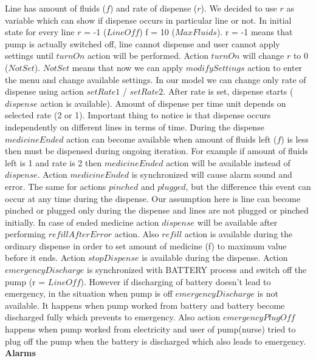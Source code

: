 \documentclass{article}
\begin{document}
Line has amount of fluids ($f$) and rate of dispense ($r$). We decided to use $r$ as variable which can show if dispense occurs in particular line or not. In initial state for every line $r$ = -1 ($LineOff$) f = 10 ($MaxFluids$). r = -1 means that pump is actually switched off, line cannot dispense and user cannot apply settings until $turnOn$ action will be performed. Action $turnOn$ will change $r$ to 0 ($NotSet$). $NotSet$ means that now we can apply $modifySettings$ action to enter the menu and change available settings. In our model we can change only rate of dispense using action $setRate1$ / $setRate2$. After rate is set, dispense starts ($dispense$ action is available). Amount of dispense per time unit depends on selected rate (2 or 1). Important thing to notice is that dispense occurs independently on different lines in terms of time. During the dispense $medicineEnded$ action can become available when amount of fluids left ($f$) is less then must be dispensed during ongoing iteration. For example if amount of fluids left is 1 and rate is 2 then $medicineEnded$ action will be available instead of $dispense$. Action $medicineEnded$ is synchronized will cause alarm sound and error. The same for actions $pinched$ and $plugged$, but the difference this event can occur at any time during the dispense. Our assumption here is line can become pinched or plugged only during the dispense and lines are not plugged or pinched initially. In case of ended medicine action $dispense$ will be available after performing $refillAfterError$ action. Also $refill$ action is available during the ordinary dispense in order to set amount of medicine (f) to maximum value before it ends. Action $stopDispense$ is available during the dispense. Action $emergencyDischarge$ is synchronized with BATTERY process and switch off the pump (r = $LineOff$). However if discharging of battery doesn’t lead to emergency, in the situation when pump is off $emergencyDischarge$ is not available. It happens when pump worked from battery and battery become discharged fully which prevents to emergency. Also action $emergencyPlugOff$ happens when pump worked from electricity and user of pump(nurse) tried to plug off the pump when the battery is discharged which also leads to emergency. \\

\textbf{Alarms} \\
\end{document}
